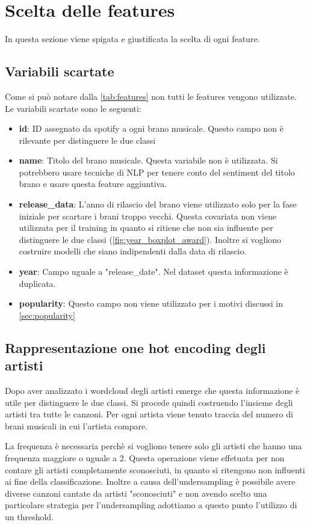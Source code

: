 \section{Scelta delle features}
In questa sezione viene spigata e giustificata la scelta di ogni feature.

\subsection{Variabili scartate}
Come si può notare dalla \autoref{tab:features} non tutti le features vengono utilizzate. Le variabili scartate sono le seguenti:

\begin{itemize}
	\item \textbf{id}: ID assegnato da spotify a ogni brano musicale. Questo campo non è rilevante per distinguere le due classi
	\item \textbf{name}: Titolo del brano musicale. Questa variabile non è utilizzata. Si potrebbero usare tecniche di NLP per tenere conto del sentiment del titolo brano e usare questa feature aggiuntiva.
	\item \textbf{release\_data}: 
	L'anno di rilascio del brano viene utilizzato solo per la fase iniziale per scartare i brani troppo vecchi. Questa covariata non viene utilizzata per il training in quanto si ritiene che non sia influente per distinguere le due classi (\autoref{fig:year_boxplot_award}). Inoltre si vogliono costruire modelli che siano indipendenti dalla data di rilascio.
	\item \textbf{year}: Campo uguale a "release\_date". Nel dataset questa informazione è duplicata. 
	\item \textbf{popularity}: Questo campo non viene utilizzato per i motivi discussi in \autoref{sec:popularity}
\end{itemize}


\subsection{Rappresentazione one hot encoding degli artisti}
\label{sec:one}
Dopo aver analizzato i wordcloud degli artisti emerge che questa informazione è utile per distinguere le due classi. Si procede quindi costruendo l'insieme degli artisti tra tutte le canzoni. Per ogni artista viene tenuto traccia del numero di brani musicali in cui l'artista compare.

La frequenza è necessaria perchè si vogliono tenere solo gli artisti che hanno una frequenza maggiore o uguale a $2$. Questa operazione viene effetuata per non contare gli artisti completamente sconosciuti, in quanto si ritengono non influenti ai fine della classificazione. 
Inoltre a causa dell'undersampling è possibile avere diverse canzoni cantate da artisti "sconosciuti" e non avendo scelto una particolare strategia per l'undersampling adottiamo a questo punto l'utilizzo di un threshold.


